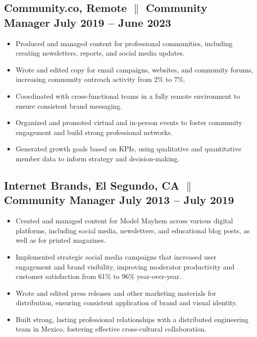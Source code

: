 \documentclass[a4paper,12pt]{article} %
\begin{document}
\subsection{Community.co, Remote {$\parallel$}{ Community Manager} \hfill
      \textbf{July 2019 – June 2023}}
\begin{itemize}
      \item Produced and managed content for professional communities, including creating newsletters, reports, and social media updates.
      \item Wrote and edited copy for email campaigns, websites, and community forums, increasing community outreach activity from 2\% to 7\%.
      \item Coordinated with cross-functional teams in a fully remote environment to ensure consistent brand messaging.
      \item Organized and promoted virtual and in-person events to foster community engagement and build strong professional networks.
      \item Generated growth goals based on KPIs, using qualitative and quantitative member data to inform strategy and decision-making.

\end{itemize}
\subsection{\small{Internet Brands, El Segundo, CA {$\parallel$}{ Community Manager} \hfill
      \textbf{July 2013 – July 2019}}}
\begin{itemize}
      \item Created and managed content for Model Mayhem across various digital platforms, including social media, newsletters, and educational blog posts, as well as for printed magazines.
      \item Implemented strategic social media campaigns that increased user engagement and brand visibility, improving moderator productivity and customer satisfaction from 61\% to 96\% year-over-year.
      \item Wrote and edited press releases and other marketing materials for distribution, ensuring consistent application of brand and visual identity.
      \item Built strong, lasting professional relationships with a distributed engineering team in Mexico, fostering effective cross-cultural collaboration.
\end{itemize}
\end{document}
